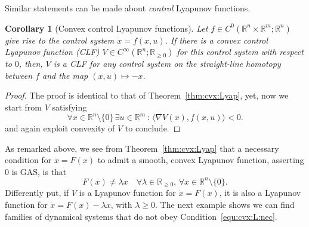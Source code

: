 \documentclass[letterpaper, 10 pt, conference]{ieeeconf}  %
\theoremstyle{mystyle}
\newtheorem{corollary}[theorem]{Corollary}
\begin{document}
Similar statements can be made about \textit{control} Lyapunov functions.
\begin{corollary}[Convex control Lyapunov functions]
\label{cor:cvx:control:Lyap}
    Let $f\in C^{0}(\mathbb{R}^n\times \mathbb{R}^m;\mathbb{R}^n)$ give rise to the control system $\dot{x}=f(x,u)$. If there is a convex control Lyapunov function (CLF) $V\in C^{\infty}(\mathbb{R}^n;\mathbb{R}_{\geq 0})$ for this control system with respect to $0$, then, $V$ is a CLF for any control system on the straight-line homotopy between $f$ and the map $(x,u)\mapsto -x$. 
\end{corollary}
\begin{proof}
    The proof is identical to that of Theorem~\ref{thm:cvx:Lyap}, yet, now we start from $V$ satisfying
    \begin{equation*}
    \forall x\in \mathbb{R}^n\setminus\{0\}\,\exists u\in \mathbb{R}^m\,:\,\langle \nabla V(x), f(x,u)\rangle < 0.
    \end{equation*}
    and again exploit convexity of $V$ to conclude. 
\end{proof}

As remarked above, we see from Theorem~\ref{thm:cvx:Lyap} that a necessary condition for $\dot{x}=F(x)$ to admit a smooth, convex Lyapunov function, asserting $0$ is GAS, is that
\begin{equation}
    \label{equ:cvx:L:nec}
   F(x)\neq \lambda x \quad \forall \lambda\in \mathbb{R}_{\geq 0},\, \forall x\in \mathbb{R}^n\setminus\{0\}. 
\end{equation}
Differently put, if $V$ is a Lyapunov function for $\dot{x}=F(x)$, it is also a Lyapunov function for $\dot{x}=F(x)-\lambda x$, with $\lambda\geq 0$. The next example shows we can find families of dynamical systems that do not obey Condition~\eqref{equ:cvx:L:nec}. 
\end{document}
